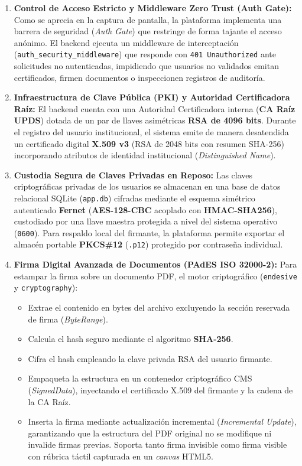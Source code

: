 \begin{enumerate}
  \item \textbf{Control de Acceso Estricto y Middleware Zero Trust (Auth Gate):} Como se aprecia en la captura de pantalla, la plataforma implementa una barrera de seguridad (\textit{Auth Gate}) que restringe de forma tajante el acceso anónimo. El backend ejecuta un middleware de interceptación (\texttt{auth\_security\_middleware}) que responde con \texttt{401 Unauthorized} ante solicitudes no autenticadas, impidiendo que usuarios no validados emitan certificados, firmen documentos o inspeccionen registros de auditoría.
  
  \item \textbf{Infraestructura de Clave Pública (PKI) y Autoridad Certificadora Raíz:} El backend cuenta con una Autoridad Certificadora interna (\textbf{CA Raíz UPDS}) dotada de un par de llaves asimétricas \textbf{RSA de 4096 bits}. Durante el registro del usuario institucional, el sistema emite de manera desatendida un certificado digital \textbf{X.509 v3} (RSA de 2048 bits con resumen SHA-256) incorporando atributos de identidad institucional (\textit{Distinguished Name}).
  
  \item \textbf{Custodia Segura de Claves Privadas en Reposo:} Las claves criptográficas privadas de los usuarios se almacenan en una base de datos relacional SQLite (\texttt{app.db}) cifradas mediante el esquema simétrico autenticado \textbf{Fernet} (\textbf{AES-128-CBC} acoplado con \textbf{HMAC-SHA256}), custodiado por una llave maestra protegida a nivel del sistema operativo (\texttt{0600}). Para respaldo local del firmante, la plataforma permite exportar el almacén portable \textbf{PKCS\#12} (\texttt{.p12}) protegido por contraseña individual.
  
  \item \textbf{Firma Digital Avanzada de Documentos (PAdES ISO 32000-2):} Para estampar la firma sobre un documento PDF, el motor criptográfico (\texttt{endesive} y \texttt{cryptography}):
  \begin{itemize}
    \item Extrae el contenido en bytes del archivo excluyendo la sección reservada de firma (\textit{ByteRange}).
    \item Calcula el hash seguro mediante el algoritmo \textbf{SHA-256}.
    \item Cifra el hash empleando la clave privada RSA del usuario firmante.
    \item Empaqueta la estructura en un contenedor criptográfico CMS (\textit{SignedData}), inyectando el certificado X.509 del firmante y la cadena de la CA Raíz.
    \item Inserta la firma mediante actualización incremental (\textit{Incremental Update}), garantizando que la estructura del PDF original no se modifique ni invalide firmas previas. Soporta tanto firma invisible como firma visible con rúbrica táctil capturada en un \textit{canvas} HTML5.
  \end{itemize}
  

\end{enumerate}
